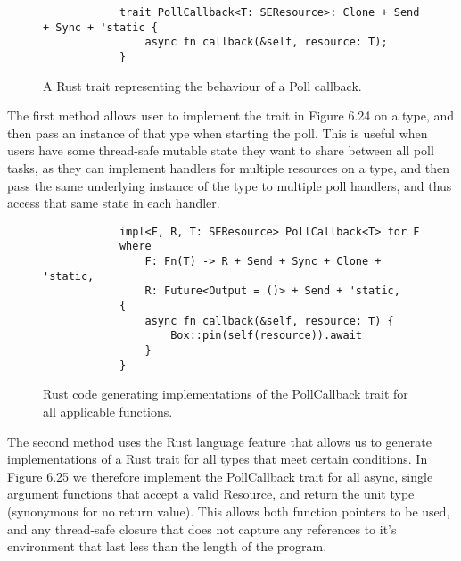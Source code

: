 \begin{figure}[h]
    \begin{center}
        \begin{lstlisting}
            trait PollCallback<T: SEResource>: Clone + Send + Sync + 'static {
                async fn callback(&self, resource: T);
            }
        \end{lstlisting}
        \label{fig:polltrait}
        \vspace{-10pt}
        \caption{A Rust trait representing the behaviour of a Poll callback.}
    \end{center}
\end{figure}

The first method allows user to implement the trait in Figure 6.24 on a type, and then pass an instance of that ype when starting the poll.
This is useful when users have some thread-safe mutable state they want to share between all poll tasks, as they can implement handlers for multiple resources on a type, and then pass the same underlying instance of the type to multiple poll handlers, and thus access that same state in each handler.


\begin{figure}[h]
    \begin{center}
        \begin{lstlisting}
            impl<F, R, T: SEResource> PollCallback<T> for F
            where
                F: Fn(T) -> R + Send + Sync + Clone + 'static,
                R: Future<Output = ()> + Send + 'static,
            {
                async fn callback(&self, resource: T) {
                    Box::pin(self(resource)).await
                }
            }            
        \end{lstlisting}
        \label{fig:pollimplgen}
        \vspace{-10pt}
        \caption{Rust code generating implementations of the PollCallback trait for all applicable functions.}
    \end{center}
\end{figure}

The second method uses the Rust language feature that allows us to generate implementations of a Rust trait for all types that meet certain conditions. In Figure 6.25 we therefore implement the PollCallback trait for all async, single argument functions that accept a valid Resource, and return the unit type (synonymous for no return value).
This allows both function pointers to be used, and any thread-safe closure that does not capture any references to it's environment that last less than the length of the program.

